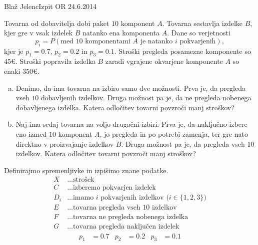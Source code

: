 \begin{naloga}{Blaž Jelenc}{Izpit OR 24.6.2014}
\begin{vprasanje}
Tovarna od dobavitelja dobi paket $10$ komponent $A$.
Tovarna sestavlja izdelke $B$,
kjer gre v vsak izdelek $B$ natanko ena komponenta $A$.
Dane so verjetnosti
$$
p_i = P(\text{med $10$ komponentami $A$ je natanko $i$ pokvarjenih}),
$$
kjer je $p_1 = 0.7$, $p_2 = 0.2$ in $p_3 = 0.1$.
Stroški pregleda posamezne komponente so $45 €$.
Stroški popravila izdelka $B$ zaradi vgrajene okvarjene komponente $A$
so enaki $350 €$.
\begin{enumerate}[(a)]
\item Denimo, da ima tovarna na izbiro samo dve možnosti.
Prva je, da pregleda vseh $10$ dobavljenih izdelkov.
Druga možnost pa je, da ne pregleda nobenega dobavljenega izdelka.
Katera odločitev tovarni povzroči manj stroškov?

\item Naj ima sedaj tovarna na voljo drugačni izbiri.
Prva je, da naključno izbere eno izmed $10$ komponent $A$,
jo pregleda in po potrebi zamenja,
ter gre nato direktno v proizvajanje izdelkov $B$.
Druga možnost pa je, da pregleda vseh $10$ izdelkov.
Katera odločitev tovarni povzroči manj stroškov?
\end{enumerate}
\end{vprasanje}

\begin{odgovor}
Definirajmo spremenljivke in izpišimo znane podatke.
\begin{align*}
X &\dots \text{strošek} \\
C &\dots \text{izberemo pokvarjen izdelek} \\
D_i &\dots \text{imamo $i$ pokvarjenih izdelkov ($i \in \{1, 2, 3\}$)} \\
E &\dots \text{tovarna pregleda vseh $10$ izdelkov} \\
F &\dots \text{tovarna ne pregleda nobenega izdelka} \\
G &\dots \text{tovarna pregleda naključen izdelek}
\end{align*}
\begin{align*}
p_1 &= 0.7 & p_2 &= 0.2 & p_3 &= 0.1
\end{align*}


\end{odgovor}
\end{naloga}
